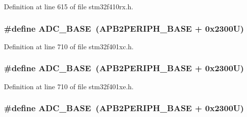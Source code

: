 Definition at line 615 of file stm32f410rx.\+h.

\subsubsection[{\texorpdfstring{A\+D\+C\+\_\+\+B\+A\+SE}{ADC_BASE}}]{\setlength{\rightskip}{0pt plus 5cm}\#define A\+D\+C\+\_\+\+B\+A\+SE~({\bf A\+P\+B2\+P\+E\+R\+I\+P\+H\+\_\+\+B\+A\+SE} + 0x2300\+U)}\hypertarget{group___peripheral__registers__structures_gad06cb9e5985bd216a376f26f22303cd6}{}\label{group___peripheral__registers__structures_gad06cb9e5985bd216a376f26f22303cd6}


Definition at line 710 of file stm32f401xc.\+h.

\subsubsection[{\texorpdfstring{A\+D\+C\+\_\+\+B\+A\+SE}{ADC_BASE}}]{\setlength{\rightskip}{0pt plus 5cm}\#define A\+D\+C\+\_\+\+B\+A\+SE~({\bf A\+P\+B2\+P\+E\+R\+I\+P\+H\+\_\+\+B\+A\+SE} + 0x2300\+U)}\hypertarget{group___peripheral__registers__structures_gad06cb9e5985bd216a376f26f22303cd6}{}\label{group___peripheral__registers__structures_gad06cb9e5985bd216a376f26f22303cd6}


Definition at line 710 of file stm32f401xe.\+h.

\subsubsection[{\texorpdfstring{A\+D\+C\+\_\+\+B\+A\+SE}{ADC_BASE}}]{\setlength{\rightskip}{0pt plus 5cm}\#define A\+D\+C\+\_\+\+B\+A\+SE~({\bf A\+P\+B2\+P\+E\+R\+I\+P\+H\+\_\+\+B\+A\+SE} + 0x2300\+U)}\hypertarget{group___peripheral__registers__structures_gad06cb9e5985bd216a376f26f22303cd6}{}\label{group___peripheral__registers__structures_gad06cb9e5985bd216a376f26f22303cd6}


